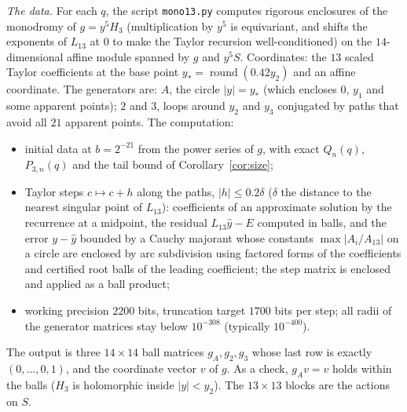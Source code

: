 \documentclass[11pt]{amsart}
\theoremstyle{definition}
\theoremstyle{remark}
\numberwithin{equation}{section}
\newcommand{\file}[1]{{\def\_{\textunderscore\allowbreak}\texttt{#1}}}
\begin{document}
\emph{The data.} For each $q$, the script \file{mono13.py} computes rigorous enclosures of the monodromy of $g=y^5H_3$
(multiplication by $y^5$ is equivariant, and shifts the exponents of $L_{13}$ at $0$ to make the Taylor recursion
well-conditioned) on the $14$-dimensional affine module spanned by $g$ and $y^5S$. Coordinates: the $13$ scaled Taylor
coefficients at the base point $y_*=\operatorname{round}(0.42y_2)$ and an affine coordinate. The generators are: $A$,
the circle $|y|=y_*$ (which encloses $0$, $y_1$ and some apparent points); $2$ and $3$, loops around $y_2$ and $y_3$
conjugated by paths that avoid all $21$ apparent points. The computation:
\begin{itemize}
\item initial data at $b=2^{-21}$ from the power series of $g$, with exact $Q_n(q)$, $P_{3,n}(q)$ and the tail bound of
Corollary~\ref{cor:size};
\item Taylor steps $c\mapsto c+h$ along the paths, $|h|\le0.2\delta$ ($\delta$ the distance to the nearest singular point
of $L_{13}$): coefficients of an approximate solution by the recurrence at a midpoint, the residual
$L_{13}\hat y-E$ computed in balls, and the error $y-\hat y$ bounded by a Cauchy majorant whose constants
$\max|A_i/A_{13}|$ on a circle are enclosed by arc subdivision using factored forms of the coefficients and certified root
balls of the leading coefficient; the step matrix is enclosed and applied as a ball product;
\item working precision $2200$ bits, truncation target $1700$ bits per step; all radii of the generator matrices stay
below $10^{-308}$ (typically $10^{-400}$).
\end{itemize}
The output is three $14\times14$ ball matrices $g_A,g_2,g_3$ whose last row is exactly $(0,\dots,0,1)$, and the
coordinate vector $v$ of $g$. As a check, $g_Av=v$ holds within the balls ($H_3$ is holomorphic inside $|y|<y_2$). The
$13\times13$ blocks are the actions on $S$.
\end{document}
